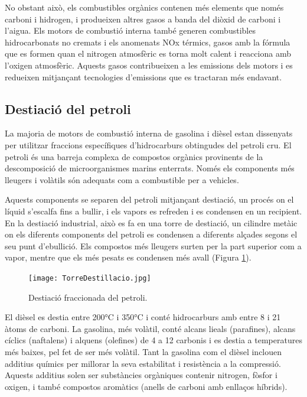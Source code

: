 No obstant aix\`o, els combustibles org\`anics contenen m\'es elements que nom\'es carboni i hidrogen, i produeixen altres gasos a banda del di\`oxid de carboni i l'aigua. Els motors de combusti\'o interna tamb\'e generen combustibles hidrocarbonats no cremats i els anomenats NOx t\'ermics, gasos amb la f\'ormula  que es formen quan el nitrogen atmosf\`eric es torna molt calent i reacciona amb l'oxigen atmosf\`eric. Aquests gasos contribueixen a les emissions dels motors i es redueixen mitjan\c{c}ant tecnologies d'emissions que es tractaran més endavant.


\subsection{Desti\lgem ació del petroli}

La majoria de motors de combustió interna de gasolina i dièsel estan dissenyats per utilitzar fraccions específiques d'hidrocarburs obtingudes del petroli cru. El petroli és una barreja complexa de compostos orgànics provinents de la descomposició de microorganismes marins enterrats. Només els components més lleugers i volàtils són adequats com a combustible per a vehicles\cite{bowers_understanding_2014}.

Aquests components se separen del petroli mitjançant desti\lgem ació, un procés on el líquid s'escalfa fins a bullir, i els vapors es refreden i es condensen en un recipient. En la desti\lgem ació industrial, això es fa en una torre de desti\lgem ació, un cilindre metà\lgem ic on els diferents components del petroli es condensen a diferents alçades segons el seu punt d'ebullició. Els compostos més lleugers surten per la part superior com a vapor, mentre que els més pesats es condensen més avall (Figura \ref{fig:torredestillacio}).

\begin{figure}
    \centering
    \texttt{[image: TorreDestillacio.jpg]}
    \caption{Desti\lgem ació fraccionada del petroli\cite{noauthor_38_2015}.}
    \label{fig:torredestillacio}
\end{figure}


El dièsel es desti\lgem a entre 200°C i 350°C i conté hidrocarburs amb entre 8 i 21 àtoms de carboni. La gasolina, més volàtil, conté alcans lieals (parafines), alcans cíclics (naftalens) i alquens (olefines) de 4 a 12 carbonis i es desti\lgem a a temperatures més baixes, pel fet de ser més volàtil. Tant la gasolina com el dièsel inclouen additius químics per millorar la seva estabilitat i resistència a la compressió. Aquests additius solen ser substàncies orgàniques contenir nitrogen, fòsfor i oxigen, i també compostos aromàtics (anells de carboni amb enllaços híbrids).

